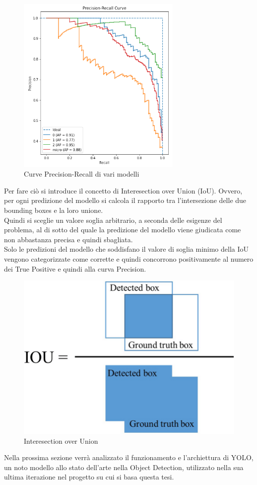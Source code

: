 \documentclass[12pt,a4paper,openright,twoside]{report}
\begin{document}
\begin{figure}[h]
\centering
\includegraphics[width=300px,keepaspectratio]{precisionRecall2.png}
\caption{Curve Precision-Recall di vari modelli}
\end{figure}
\newpage
Per fare ciò si introduce il concetto di Interesection over Union (IoU). Ovvero, per ogni predizione del modello si calcola il rapporto tra l'intersezione delle due bounding boxes e la loro unione. \\
Quindi si sceglie un valore soglia arbitrario, a seconda delle esigenze del problema, al di sotto del quale la predizione del modello viene giudicata come non abbastanza precisa e quindi sbagliata. 
\\ Solo le predizioni del modello che soddisfano il valore di soglia minimo della IoU vengono categorizzate come corrette e quindi concorrono positivamente al numero dei True Positive e quindi alla curva Precision.
\begin{figure}[h]
\centering
\includegraphics[width=\linewidth]{IoU.png}
\caption{Interesection over Union}
\end{figure}
Nella prossima sezione verrà analizzato il funzionamento e l'archiettura di YOLO, un noto modello allo stato dell'arte nella Object Detection, utilizzato nella sua ultima iterazione nel progetto su cui si basa questa tesi.
\newpage
\end{document}
